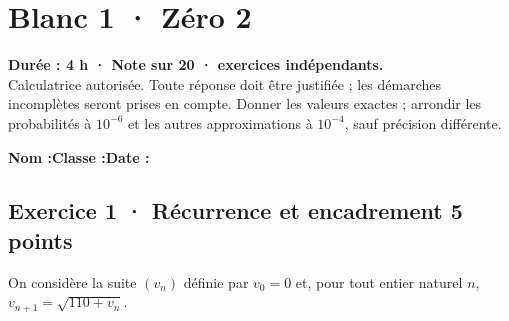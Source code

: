 \fi

\mxnewpage{}\label{sujet:5-2}

\section*{Blanc 1 · Zéro 2}


\textbf{Durée : 4 h · Note sur 20 ·  exercices indépendants.}\\Calculatrice autorisée. Toute réponse doit être justifiée ; les démarches incomplètes seront prises en compte. Donner les valeurs exactes ; arrondir les probabilités à $10^{-6}$ et les autres approximations à $10^{-4}$, sauf précision différente.

\smallskip\textbf{Nom :}\enspace\dotfill\quad\textbf{Classe :}\enspace\dotfill\quad\textbf{Date :}\enspace\dotfill

\subsection*{Exercice 1 · Récurrence et encadrement \hfill 5 points}On considère la suite $(v_n)$ définie par $v_0=0$ et, pour tout entier naturel $n$, $v_{n+1}=\sqrt{110+v_n}$.


